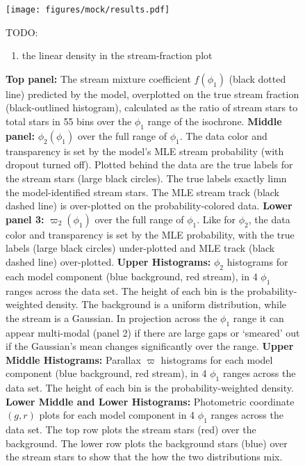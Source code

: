 \documentclass[twocolumn]{aastex631}
\begin{document}
    \begin{figure}
        \centering
        \texttt{[image: figures/mock/results.pdf]}
        \caption{
            \textbf{Top panel:}%
                The stream mixture coefficient $f(\phi_1)$ (black dotted line)
                predicted by the model, overplotted on the true stream fraction
                (black-outlined histogram), calculated as the ratio of stream
                stars to total stars in 55 bins over the $\phi_1$ range of the
                isochrone.  \textbf{Middle panel: }%
                $\phi_2(\phi_1)$ over the full range of $\phi_1$. The data color
                and transparency is set by the model's MLE stream probability
                (with dropout turned off). Plotted behind the data are the true
                labels for the stream stars (large black circles).  The true
                labels exactly limn the model-identified stream stars.  The MLE
                stream track (black dashed line) is over-plotted on the
                probability-colored data.
            \textbf{Lower panel 3: }%
                $\varpi_2(\phi_1)$ over the full range of $\phi_1$. Like for
                $\phi_2$, the data color and transparency is set by the MLE
                probability, with the true labels (large black circles)
                under-plotted and MLE track (black dashed line) over-plotted.
            \textbf{Upper Histograms: }%
                $\phi_2$ histograms for each model component (blue background,
                red stream), in 4 $\phi_1$ ranges across the data set.  The
                height of each bin is the probability-weighted density.  The
                background is a uniform distribution, while the stream is a
                Gaussian. In projection across the $\phi_1$ range it can appear
                multi-modal (panel 2) if there are large gaps or `smeared' out
                if the Gaussian's mean changes significantly over the range.
            \textbf{Upper Middle Histograms: }%
                Parallax $\varpi$ histograms for each model component (blue
                background, red stream), in 4 $\phi_1$ ranges across the data
                set.  The height of each bin is the probability-weighted
                density.
            \textbf{Lower Middle and Lower Histograms:}%
                Photometric coordinate $(g, r)$ plots for each model component
                in 4 $\phi_1$ ranges across the data set. The top row plots the
                stream stars (red) over the background. The lower row plots the
                background stars (blue) over the stream stars to show that the
                how the two distributions mix.  } TODO:
        \begin{enumerate}
            \item the linear density in the stream-fraction plot
        \end{enumerate}
        \label{fig:mock_data_result}
    \end{figure}
\end{document}
